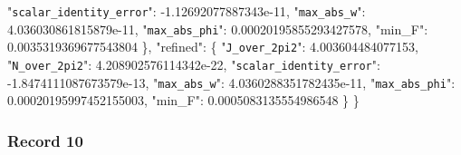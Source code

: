 \documentclass[
  10pt,
]{article}
\newenvironment{Shaded}{}{}
\newcommand{\DataTypeTok}[1]{\textcolor[rgb]{0.56,0.13,0.00}{#1}}
\newcommand{\FloatTok}[1]{\textcolor[rgb]{0.25,0.63,0.44}{#1}}
\newcommand{\FunctionTok}[1]{\textcolor[rgb]{0.02,0.16,0.49}{#1}}
\begin{document}
\begin{Shaded}
\begin{Highlighting}[]
    \DataTypeTok{"\nolinkurl{scalar_identity_error}"}\FunctionTok{:} \FloatTok{{-}1.12692077887343e{-}11}\FunctionTok{,}
    \DataTypeTok{"\nolinkurl{max_abs_w}"}\FunctionTok{:} \FloatTok{4.036030861815879e{-}11}\FunctionTok{,}
    \DataTypeTok{"\nolinkurl{max_abs_phi}"}\FunctionTok{:} \FloatTok{0.00020195855293427578}\FunctionTok{,}
    \DataTypeTok{"min\_F"}\FunctionTok{:} \FloatTok{0.0035319369677543804}
  \FunctionTok{\},}
  \DataTypeTok{"refined"}\FunctionTok{:} \FunctionTok{\{}
    \DataTypeTok{"\nolinkurl{J_over_2pi2}"}\FunctionTok{:} \FloatTok{4.003604484077153}\FunctionTok{,}
    \DataTypeTok{"\nolinkurl{N_over_2pi2}"}\FunctionTok{:} \FloatTok{4.208902576114342e{-}22}\FunctionTok{,}
    \DataTypeTok{"\nolinkurl{scalar_identity_error}"}\FunctionTok{:} \FloatTok{{-}1.8474111087673579e{-}13}\FunctionTok{,}
    \DataTypeTok{"\nolinkurl{max_abs_w}"}\FunctionTok{:} \FloatTok{4.0360288351782435e{-}11}\FunctionTok{,}
    \DataTypeTok{"\nolinkurl{max_abs_phi}"}\FunctionTok{:} \FloatTok{0.00020195997452155003}\FunctionTok{,}
    \DataTypeTok{"min\_F"}\FunctionTok{:} \FloatTok{0.0005083135554986548}
  \FunctionTok{\}}
\FunctionTok{\}}
\end{Highlighting}
\end{Shaded}

\hypertarget{record-10}{%
\subsubsection{Record 10}\label{record-10}}
\end{document}
